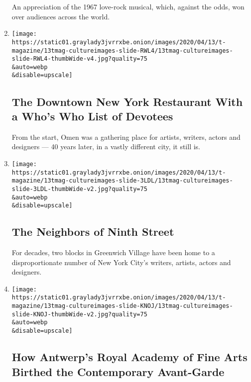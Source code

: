 \begin{enumerate}
  An appreciation of the 1967 love-rock musical, which, against the
  odds, won over audiences across the world.
\item
  \href{/interactive/2020/04/13/t-magazine/omen-restaurant-nyc.html}{}

  \texttt{[image: https://static01.graylady3jvrrxbe.onion/images/2020/04/13/t-magazine/13tmag-cultureimages-slide-RWL4/13tmag-cultureimages-slide-RWL4-thumbWide-v4.jpg?quality=75\\\&auto=webp\\\&disable=upscale]}

  \hypertarget{the-downtown-new-york-restaurant-with-a-whos-who-list-of-devotees}{%
  \subsection{The Downtown New York Restaurant With a Who's Who List of
  Devotees}\label{the-downtown-new-york-restaurant-with-a-whos-who-list-of-devotees}}

  From the start, Omen was a gathering place for artists, writers,
  actors and designers --- 40 years later, in a vastly different city,
  it still is.
\item
  \href{/interactive/2020/04/13/t-magazine/ninth-street-greenwich-village-neighbors.html}{}

  \texttt{[image: https://static01.graylady3jvrrxbe.onion/images/2020/04/13/t-magazine/13tmag-cultureimages-slide-3LDL/13tmag-cultureimages-slide-3LDL-thumbWide-v2.jpg?quality=75\\\&auto=webp\\\&disable=upscale]}

  \hypertarget{the-neighbors-of-ninth-street}{%
  \subsection{The Neighbors of Ninth
  Street}\label{the-neighbors-of-ninth-street}}

  For decades, two blocks in Greenwich Village have been home to a
  disproportionate number of New York City's writers, artists, actors
  and designers.
\item
  \href{/interactive/2020/04/13/t-magazine/royal-academy-antwerp.html}{}

  \texttt{[image: https://static01.graylady3jvrrxbe.onion/images/2020/04/13/t-magazine/13tmag-cultureimages-slide-KNOJ/13tmag-cultureimages-slide-KNOJ-thumbWide-v2.jpg?quality=75\\\&auto=webp\\\&disable=upscale]}

  \hypertarget{how-antwerps-royal-academy-of-fine-arts-birthed-the-contemporary-avant-garde}{%
  \subsection{How Antwerp's Royal Academy of Fine Arts Birthed the
  Contemporary
  Avant-Garde}\label{how-antwerps-royal-academy-of-fine-arts-birthed-the-contemporary-avant-garde}}


\end{enumerate}
